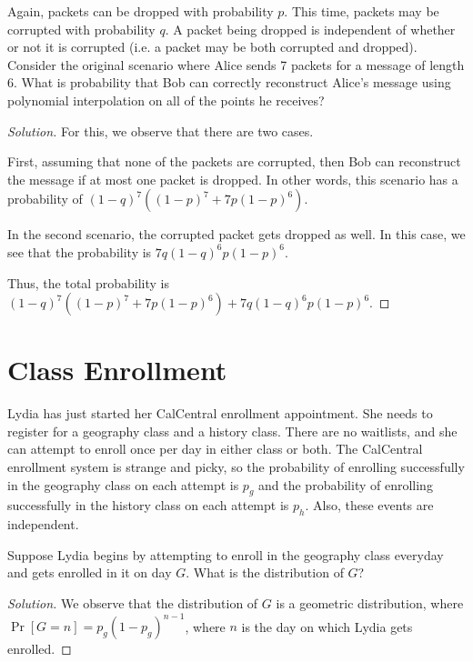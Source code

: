 \documentclass{article}
\newenvironment{solution}{\begin{proof}[Solution]}{\end{proof}}
\begin{document}
\begin{hw}
	Again, packets can be dropped with probability $p$. This time, packets may be corrupted with
	probability $q$. A packet being dropped is independent of whether or not it is corrupted (i.e. a
	packet may be both corrupted and dropped). Consider the original scenario where Alice sends
	7 packets for a message of length 6. What is probability that Bob can correctly reconstruct
	Alice’s message using polynomial interpolation on all of the points he receives?
\end{hw}
\begin{solution}
	For this, we observe that there are two cases.
	
	First, assuming that none of the packets are corrupted, then Bob can reconstruct the message if at most one packet is dropped. In other words, this scenario has a probability of $(1-q)^{7}( (1-p)^{7} + 7p(1-p)^{6})$.
	
	In the second scenario, the corrupted packet gets dropped as well. In this case, we see that the probability is $7q(1-q)^{6}p(1-p)^{6}$.
	
	Thus, the total probability is $(1-q)^{7}( (1-p)^{7} + 7p(1-p)^{6}) + 7q(1-q)^{6}p(1-p)^{6}$.
\end{solution}

\newpage

\section{Class Enrollment}
Lydia has just started her CalCentral enrollment appointment. She needs to register for a geography class and a history class. There are no waitlists, and she can attempt to enroll once per day in either class or both. The CalCentral enrollment system is strange and picky, so the probability of enrolling successfully in the geography class on each attempt is $p_{g}$ and the probability of enrolling successfully in the history class on each attempt is $p_{h}$. Also, these events are independent.

\begin{hw}
	Suppose Lydia begins by attempting to enroll in the geography class everyday and gets enrolled in it on day $G$. What is the distribution of $G$?
\end{hw}
\begin{solution}
	We observe that the distribution of $G$ is a geometric distribution, where $\Pr[G = n] = p_{g}(1-p_{g})^{n-1}$, where $n$ is the day on which Lydia gets enrolled.
\end{solution}
\end{document}
